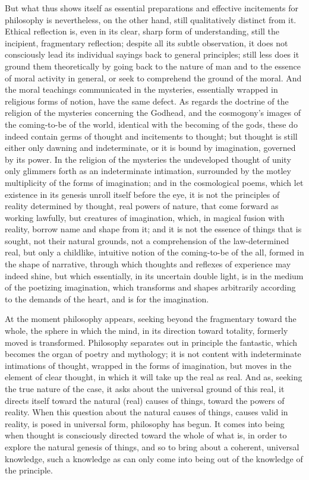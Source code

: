 But what thus shows itself as essential preparations and effective
incitements for philosophy is nevertheless, on the other hand, still
qualitatively distinct from it. Ethical reflection is, even in its clear,
sharp form of understanding, still the incipient, fragmentary reflection;
despite all its subtle observation, it does not consciously lead its
individual sayings back to general principles; still less does it ground them
theoretically by going back to the nature of man and to the essence of moral
activity in general, or seek to comprehend the ground of the moral. And the
moral teachings communicated in the mysteries, essentially wrapped in
religious forms of notion, have the same defect. As regards the
doctrine of the religion of the mysteries concerning the Godhead, and the
cosmogony's images of the coming-to-be of the world, identical with the
becoming of the gods, these do indeed contain germs of thought and incitements
to thought; but thought is still either only dawning and indeterminate, or it
is bound by imagination, governed by its power. In the religion of the
mysteries the undeveloped thought of unity only glimmers forth as an
indeterminate intimation, surrounded by the motley multiplicity of the forms of
imagination; and in the cosmological poems, which let existence in its genesis
unroll itself before the eye, it is not the principles of reality determined by
thought, real powers of nature, that come forward as working lawfully, but
creatures of imagination, which, in magical fusion with reality, borrow name
and shape from it; and it is not the essence of things that is sought, not
their natural grounds, not a comprehension of the law-determined real, but
only a childlike, intuitive notion of the coming-to-be of the all, formed in
the shape of narrative, through which thoughts and reflexes of experience may
indeed shine, but which essentially, in its uncertain double light, is in the
medium of the poetizing imagination, which transforms and shapes arbitrarily
according to the demands of the heart, and is for the imagination.

At the moment philosophy appears, seeking beyond the fragmentary toward the
whole, the sphere in which the mind, in its direction toward totality,
formerly moved is transformed. Philosophy separates out in principle the
fantastic, which becomes the organ of poetry and mythology; it is not content
with indeterminate intimations of thought, wrapped in the forms of
imagination, but moves in the element of clear thought, in which it will take
up the real as real. And as, seeking the true nature of the case, it asks
about the universal ground of this real, it directs itself toward the natural
(real) causes of things, toward the powers of reality. When this question
about the natural causes of things, causes valid in reality, is posed in
universal form, philosophy has begun. It comes into being when thought is
consciously directed toward the whole of what is, in order to explore
the natural genesis of things, and so to bring about a coherent,
universal knowledge, such a knowledge as can only come into being out of the
knowledge of the principle.

